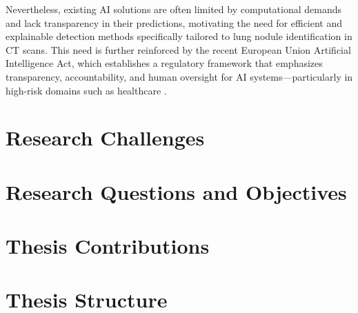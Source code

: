 Nevertheless, existing AI solutions are often limited by computational demands and lack transparency in their predictions, motivating the need for efficient and explainable detection methods specifically tailored to lung nodule identification in CT scans.
This need is further reinforced by the recent European Union Artificial Intelligence Act, which establishes a regulatory framework that emphasizes transparency, accountability, and human oversight for AI systems—particularly in high-risk domains such as healthcare \cite{eu_ai_act}.

\section{Research Challenges}


\section{Research Questions and Objectives}

\section{Thesis Contributions}

\section{Thesis Structure}